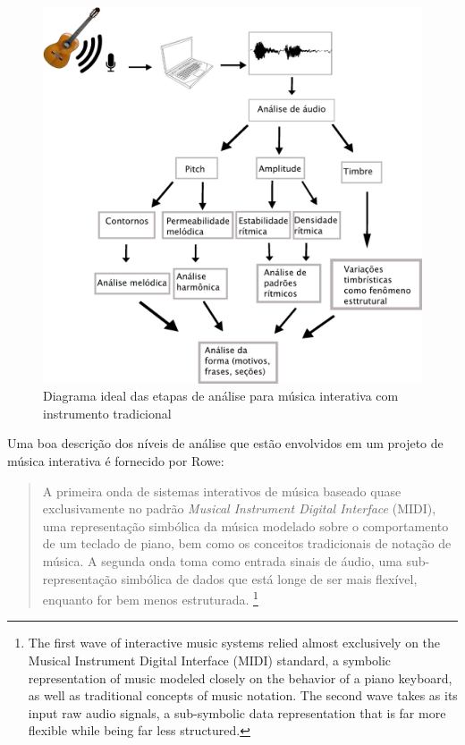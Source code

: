 \documentclass{ppgmus}
\begin{document}
\begin{figure}
\includegraphics[scale=.9]{analise}
\caption{Diagrama ideal das etapas de análise para música interativa com instrumento tradicional}
\label{analise-geral}
\end{figure} 

Uma boa descrição dos níveis de análise que estão envolvidos em um projeto
de música interativa é fornecido por Rowe:

\begin{quote}
A primeira onda de sistemas interativos de música baseado quase exclusivamente no padrão \textit{Musical
Instrument Digital Interface} (MIDI), uma representação simbólica da música modelado
sobre o comportamento de um teclado de piano, bem como os conceitos tradicionais de notação de música.
A segunda onda toma como entrada sinais de áudio, uma sub-representação simbólica de dados que está longe
de ser mais flexível, enquanto for bem menos estruturada. \cite{rowe09:levels}
\footnote{The first wave of interactive music systems relied almost exclusively on the Musical 
Instrument Digital Interface (MIDI) standard, a symbolic representation of music modeled 
closely on the behavior of a piano keyboard, as well as traditional concepts of music notation. 
The second wave takes as its input raw audio signals, a sub-symbolic data representation that is far 
more flexible while being far less structured.}
\end{quote}
\end{document}

